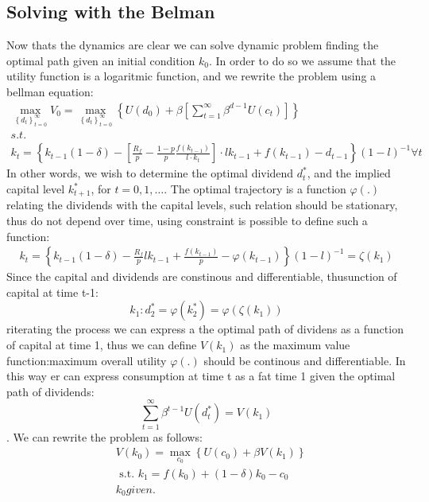 \documentclass[12pt]{article}
\begin{document}
\subsection{Solving with the Belman}
Now thats the dynamics are clear we can solve dynamic problem finding the optimal path given an initial condition
\(k_0\). In order to do so we assume that the utility function is a logaritmic function, and we rewrite the problem
using a bellman equation:
\begin{equation}
    \begin{gathered}
    \max _{\left\{d_t\right\}_{t=0}^{\infty}} V_0=\max _{\left\{d_t\right\}_{t=0}^{\infty}}\left\{U\left(d_0\right)+\beta\left[\sum_{t=1}^{\infty}
 \beta^{d-1} U\left(c_t\right)\right]\right\}  \\
 s.t. \\
 k_t = \left\{k_{t-1}(1 - \delta) - \left[\frac{R_f}{p}  -\frac{ 1-p }{ p }\frac{f(k_{t-1})}{l \cdot k_t}\right] \cdot l k_{t-1}
+ f(k_{t-1}) - d_{t-1}\right\}{\left(1-l\right)}^{-1} \forall t
    \end{gathered}
\end{equation}
In other words, we wish to determine the optimal dividend $d_t^*$, and the implied capital level $k_{t+1}^*$, for
$t=0,1, \ldots$. The optimal trajectory is a function \(\varphi(.)\) relating the dividends with the capital levels,
such relation should be stationary, thus do not depend over time, using constraint is possible to define such a
function:
\begin{equation}
    \begin{gathered}
        k_t = \left\{k_{t-1}(1 - \delta) - \frac{R_f}{p} l k_{t-1}  
+ \frac{f(k_{t-1})}{p} - \varphi(k_{t-1})\right\}{\left(1-l\right)}^{-1} = \zeta(k_1)
    \end{gathered}
\end{equation}
Since the capital and dividends are constinous and differentiable, thusunction of capital at time t-1:
\[k_1: d_2^*=\varphi\left(k_2^*\right)=\varphi\left(\zeta\left(k_1\right)\right)\]
riterating the process we can express a the optimal path of dividens as a function of capital at time 1, thus we can
define \(V(k_1)\) as the maximum value function:maximum overall utility  \(\varphi(.)\) should be continous and
differentiable. In this way er can express consumption at time t as a fat time 1 given the optimal path of dividends:
\[\sum_{t=1}^{\infty} \beta^{t-1} U\left(d_t^*\right)=V\left(k_1\right)\].
We can rewrite the problem as follows:
\begin{equation}
    \begin{aligned}
        & V\left(k_0\right)=\max _{c_0}\left\{U\left(c_0\right)+\beta V\left(k_1\right)\right\} \\
        & \text { s.t. } k_1=f\left(k_0\right)+(1-\delta) k_0-c_0 \\
        & k_0 given.
    \end{aligned}
\end{equation}
\end{document}
